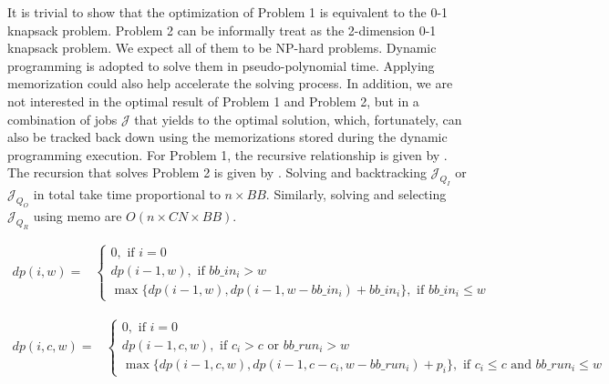 It is trivial to show that the optimization of Problem 1
is equivalent to the 0-1 knapsack problem.
Problem 2 can be informally treat as the 2-dimension 0-1 knapsack problem.
We expect all of them to be NP-hard problems.
Dynamic programming is adopted to solve them in pseudo-polynomial time.
Applying memorization could also help accelerate the solving process.
In addition, we are not interested in the optimal result of
Problem 1 and Problem 2,
but in a combination of jobs $\mathcal{J}$ that yields to the optimal solution,
which, fortunately, can also be tracked back down using the memorizations stored during the dynamic programming execution.
For Problem 1, the recursive relationship is given by .
The recursion that solves Problem 2 is given by .
Solving  and 
backtracking $\mathcal{J}_{Q_I}$ or $\mathcal{J}_{Q_O}$ in total take time proportional to $n\times BB$.
Similarly, solving  and selecting $\mathcal{J}_{Q_R}$ using memo
are $O(n\times CN\times BB)$.


\begin{strip}
        \begin{align}
                dp(i, w) = & 
                \left\{
                        \begin{array}{l}
                                0, \text{ if $i=0$ } \\ [0.6em]
                                dp(i-1, w), \text{ if $bb\_in_i > w$} \\ [0.6em]
                                \max \{ dp(i-1, w), dp(i-1, w-bb\_in_i) + bb\_in_i \}, \text{ if $bb\_in_i \leq w$}
                        \end{array} 
                \right.
                \label{Equ:MaxTransferDataRecursion} 
        \end{align}
\end{strip}

\begin{strip}
        \begin{align}
                dp(i, c, w) = &
                \left\{
                        \begin{array}{l}
                                0, \text{ if $i=0$ } \\ [0.6em]
                                dp(i-1, c, w), \text{ if $c_i > c$ or $bb\_run_i > w$} \\ [0.6em]
                                \max \{ dp(i-1, c, w), dp(i-1, c - c_i, w - bb\_run_i) + p_i \}, \text{ if $c_i \leq c$ and $bb\_run_i \leq w$}
                        \end{array} 
                \right.
                \label{Equ:MaxProductRecursion}
        \end{align}
\end{strip}


